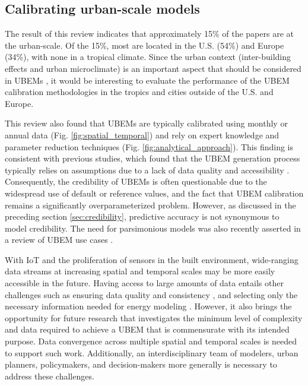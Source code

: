 \documentclass[review]{elsarticle}
\begin{document}
\subsection{Calibrating urban-scale models}

The result of this review indicates that approximately 15\% of the papers are at the urban-scale. Of the 15\%, most are located in the U.S. (54\%) and Europe (34\%), with none in a tropical climate. Since the urban context (inter-building effects and urban microclimate) is an important aspect that should be considered in UBEMs \cite{hong2020ten, miller2018urban}, it would be interesting to evaluate the performance of the UBEM calibration methodologies in the tropics and cities outside of the U.S. and Europe. 

This review also found that UBEMs are typically calibrated using monthly or annual data (Fig. \ref{fig:spatial_temporal}) and rely on expert knowledge and parameter reduction techniques (Fig. \ref{fig:analytical_approach}). This finding is consistent with previous studies, which found that the UBEM generation process typically relies on assumptions due to a lack of data quality and accessibility \cite{chen2019development, reinhart2016urban}. Consequently, the credibility of UBEMs is often questionable due to the widespread use of default or reference values, and the fact that UBEM calibration remains a significantly overparameterized problem. However, as discussed in the preceding section \ref{sec:credibility}, predictive accuracy is not synonymous to model credibility. The need for parsimonious models was also recently asserted in a review of UBEM use cases \cite{ang2020concept}.

With IoT and the proliferation of sensors in the built environment, wide-ranging data streams at increasing spatial and temporal scales may be more easily accessible in the future. Having access to large amounts of data entails other challenges such as ensuring data quality and consistency \cite{noardo2020tools, chen2019development}, and selecting only the necessary information needed for energy modeling \cite{biljecki2021extending}. However, it also brings the opportunity for future research that investigates the minimum level of complexity and data required to achieve a UBEM that is commensurate with its intended purpose. Data convergence across multiple spatial and temporal scales is needed to support such work. Additionally, an interdisciplinary team of modelers, urban planners, policymakers, and decision-makers more generally is necessary to address these challenges.
\end{document}
